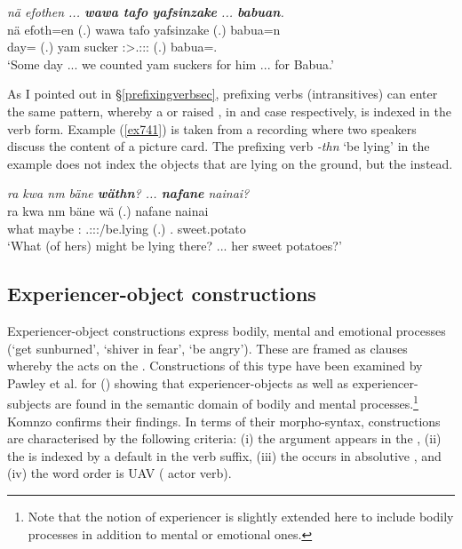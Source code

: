 \begin{exe}
	\ex \emph{nä efothen ... \textbf{wawa tafo} \textbf{yafsinzake} ... \textbf{babuan}.}\\
	\gll nä efoth=en (.) wawa tafo ya{fsi}nzake (.) babua=n\\
	\Indf{} day=\Loc{} (.) yam sucker \Fpl:\Sbj>\Tsg.\Masc:\Io:\Pst:\Ipfv{} (.) babua=\Dat.\Sg{}\\
	\trans `Some day ... we counted yam suckers for him ... for Babua.'\\
	\label{ex577}
\end{exe}

As I pointed out in \S{}\ref{prefixingverbsec}, prefixing verbs (intransitives) can enter the same pattern, whereby a  or raised , in  and  case respectively, is indexed in the verb form. Example (\ref{ex741}) is taken from a recording where two speakers discuss the content of a picture card. The prefixing verb \emph{-thn} `be lying' in the example does not index the objects that are lying on the ground, but the  instead.

\begin{exe}
	\ex \emph{ra kwa nm bäne \textbf{wäthn}? ... \textbf{nafane} nainai?}\\
	\gll ra kwa nm bäne wä (.) nafane nainai\\
	what \Fut{} maybe \Dem:\Med{} \Tsg.\F:\Io:\Nonpast:\Ipfv/be.lying (.) \Tsg.\Poss{} sweet.potato\\
	\trans `What (of hers) might be lying there? ... her sweet potatoes?'\\
	\label{ex741}
\end{exe}

\subsection{Experiencer-object constructions}\label{expobjconstr}

Experiencer-object constructions express bodily, mental and emotional processes (`get sunburned', `shiver in fear', `be angry'). These are framed as  clauses whereby the  acts on the . Constructions of this type have been examined by Pawley et al. for  (\citeyear{Pawley:2000vp}) showing that experiencer-objects as well as experiencer-subjects are found in the semantic domain of bodily and mental processes.\footnote{Note that the notion of experiencer is slightly extended here to include bodily processes in addition to mental or emotional ones.} Komnzo confirms their findings. In terms of their morpho-syntax,  constructions are characterised by the following criteria: (i) the  argument appears in the , (ii) the  is indexed by a default \Tsg{} in the verb suffix, (iii) the  occurs in absolutive , and (iv) the word order is UAV ( actor verb).%

